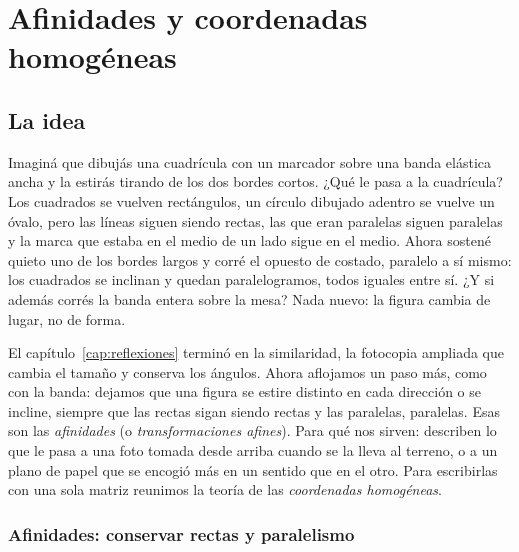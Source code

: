 \chapter{Afinidades y coordenadas homogéneas}\label{cap:afines}


\section{La idea}

Imaginá que dibujás una cuadrícula con un marcador sobre una banda elástica ancha y la estirás
tirando de los dos bordes cortos. ¿Qué le pasa a la cuadrícula? Los cuadrados se vuelven
rectángulos, un círculo dibujado adentro se vuelve un óvalo, pero las líneas siguen siendo
rectas, las que eran paralelas siguen paralelas y la marca que estaba en el medio de un lado
sigue en el medio. Ahora sostené quieto uno de los bordes largos y corré el opuesto de
costado, paralelo a sí mismo: los cuadrados se inclinan y quedan paralelogramos, todos iguales
entre sí. ¿Y si además corrés la banda entera sobre la mesa?
Nada nuevo: la figura cambia de lugar, no de forma.

El capítulo~\ref{cap:reflexiones} terminó en la similaridad, la fotocopia ampliada que cambia
el tamaño y conserva los ángulos. Ahora aflojamos un paso más, como con la banda: dejamos que
una figura se estire distinto en cada dirección o se incline, siempre que las rectas sigan
siendo rectas y las paralelas, paralelas. Esas son las \emph{afinidades} (o
\emph{transformaciones afines}). Para qué nos sirven: describen lo que le pasa a una foto
tomada desde arriba cuando se la lleva al terreno, o a un plano de papel que se encogió más en
un sentido que en el otro. Para escribirlas con una sola matriz reunimos la teoría de las
\emph{coordenadas homogéneas}.

\subsection{Afinidades: conservar rectas y paralelismo}\label{sec:afinidades-primera}

{\small\vspace{1mm}\par}

